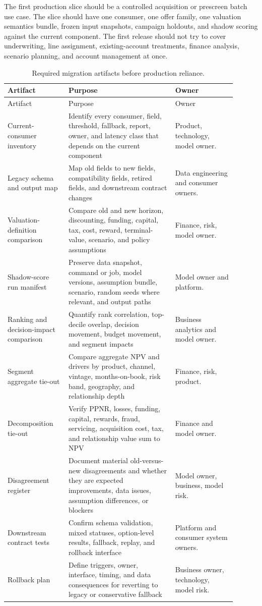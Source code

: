 \documentclass[11pt]{article}
\newcommand{\1}{\mathbf{1}}
\begin{document}
The first production slice should be a controlled acquisition or prescreen
batch use case. The slice should have one consumer, one offer family, one
valuation semantics bundle, frozen input snapshots, campaign holdouts, and
shadow scoring against the current component. The first release should not try
to cover underwriting, line assignment, existing-account treatments, finance
analysis, scenario planning, and account management at once.

\begin{longtable}{L{0.24\linewidth}L{0.42\linewidth}L{0.24\linewidth}}
\caption{Required migration artifacts before production reliance.}
\label{tab:migration-artifacts}\\
\toprule
Artifact & Purpose & Owner \\
\midrule
\endfirsthead
\toprule
Artifact & Purpose & Owner \\
\midrule
\endhead
Current-consumer inventory
  & Identify every consumer, field, threshold, fallback, report, owner, and
    latency class that depends on the current component
  & Product, technology, model owner. \\
Legacy schema and output map
  & Map old fields to new fields, compatibility fields, retired fields, and
    downstream contract changes
  & Data engineering and consumer owners. \\
Valuation-definition comparison
  & Compare old and new horizon, discounting, funding, capital, tax, cost,
    reward, terminal-value, scenario, and policy assumptions
  & Finance, risk, model owner. \\
Shadow-score run manifest
  & Preserve data snapshot, command or job, model versions, assumption bundle,
    scenario, random seeds where relevant, and output paths
  & Model owner and platform. \\
Ranking and decision-impact comparison
  & Quantify rank correlation, top-decile overlap, decision movement, budget
    movement, and segment impacts
  & Business analytics and model owner. \\
Segment aggregate tie-out
  & Compare aggregate NPV and drivers by product, channel, vintage,
    months-on-book, risk band, geography, and relationship depth
  & Finance, risk, product. \\
Decomposition tie-out
  & Verify PPNR, losses, funding, capital, rewards, fraud, servicing,
    acquisition cost, tax, and relationship value sum to NPV
  & Finance and model owner. \\
Disagreement register
  & Document material old-versus-new disagreements and whether they are
    expected improvements, data issues, assumption differences, or blockers
  & Model owner, business, model risk. \\
Downstream contract tests
  & Confirm schema validation, mixed statuses, option-level results, fallback,
    replay, and rollback interface
  & Platform and consumer system owners. \\
Rollback plan
  & Define triggers, owner, interface, timing, and data consequences for
    reverting to legacy or conservative fallback
  & Business owner, technology, model risk. \\
\bottomrule
\end{longtable}
\end{document}
